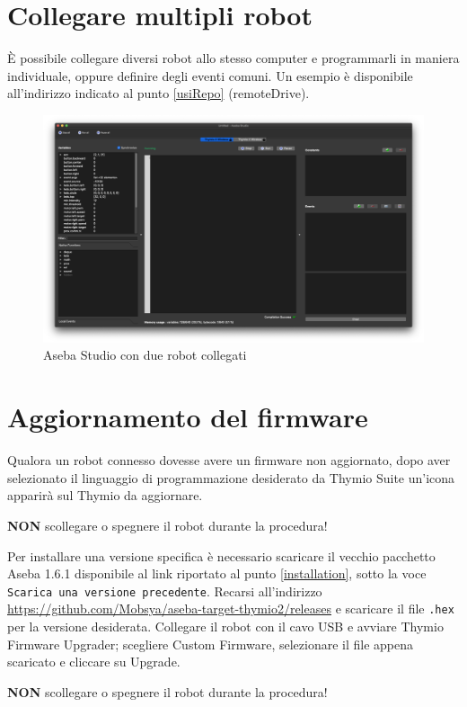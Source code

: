\documentclass[12pt]{article}
\begin{document}
	
\section{Collegare multipli robot}\label{multi-robot}

	È possibile collegare diversi robot allo stesso computer e programmarli in maniera individuale, oppure definire degli eventi comuni. Un esempio è disponibile all'indirizzo indicato al punto \ref{usiRepo} (remoteDrive).
	
	\begin{figure}[H]
		\includegraphics[width=\textwidth]{img/multiRobot.png}
		\caption{Aseba Studio con due robot collegati}
		\label{multiRobot}
	\end{figure}

		
\section{Aggiornamento del firmware}

	Qualora un robot connesso dovesse avere un firmware non aggiornato, dopo aver selezionato il linguaggio di programmazione desiderato da Thymio Suite un'icona apparirà sul Thymio da aggiornare.
	
	\textbf{NON} scollegare o spegnere il robot durante la procedura!
	
	Per installare una versione specifica è necessario scaricare il vecchio pacchetto Aseba 1.6.1 disponibile al link riportato al punto \ref{installation}, sotto la voce \texttt{Scarica una versione precedente}.	
	Recarsi all'indirizzo \url{https://github.com/Mobsya/aseba-target-thymio2/releases} e scaricare il file \texttt{.hex} per la versione desiderata. Collegare il robot con il cavo USB e avviare Thymio Firmware Upgrader; scegliere Custom Firmware, selezionare il file appena scaricato e cliccare su Upgrade. 
	
	\textbf{NON} scollegare o spegnere il robot durante la procedura!
	
\end{document}
